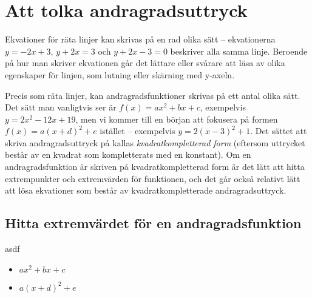 \section{Att tolka andragradsuttryck}

Ekvationer för räta linjer kan skrivas på en rad olika sätt -- ekvationerna $y = -2x + 3$, $y + 2x = 3$ och $y + 2x - 3 = 0$ beskriver alla samma linje.
Beroende på hur man skriver ekvationen går det lättare eller svårare att läsa av olika egenskaper för linjen, som lutning eller skärning med y-axeln.

Precis som räta linjer, kan andragradsfunktioner skrivas på ett antal olika sätt.
Det sätt man vanligtvis ser är \mbox{$f(x) = ax^2 + bx + c$}, exempelvis $y=2x^2 - 12x + 19$, men vi kommer till en början att fokusera på formen \mbox{$f(x) = a(x+d)^2+e$} istället -- exempelvis $y=2(x-3)^2+1$.
Det sättet att skriva andragradsuttryck på kallas \textit{kvadratkompletterad form} (eftersom uttrycket består av en kvadrat som kompletterats med en konstant).
Om en andragradsfunktion är skriven på kvadratkompletterad form är det lätt att hitta extrempunkter och extremvärden för funktionen, och det går också relativt lätt att lösa ekvationer som består av kvadratkompletterade andragradsuttryck.

\subsection{Hitta extremvärdet för en andragradsfunktion}

asdf

\begin{itemize}
  \item {} $ax^2+bx+c$
  \item {} $a(x+d)^2+e$
\end{itemize}
